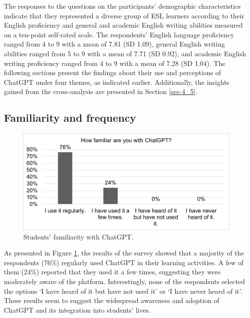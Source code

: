 \documentclass[english]{textolivre}
\begin{document}
The responses to the questions on the participants’ demographic characteristics indicate that they represented a diverse group of ESL learners according to their English proficiency and general and academic English writing abilities measured on a ten-point self-rated scale. The respondents’ English language proficiency ranged from 4 to 9 with a mean of 7.81 (SD 1.09), general English writing abilities ranged from 5 to 9 with a mean of 7.71 (SD 0.92), and academic English writing proficiency ranged from 4 to 9 with a mean of 7.28 (SD 1.04). The following sections present the findings about their use and perceptions of ChatGPT under four themes, as indicated earlier. Additionally, the insights gained from the cross-analysis are presented in Section \ref{sec-4_5}.

\subsection{Familiarity and frequency}
\begin{figure}[h!]
    \centering
    \begin{minipage}{0.80\linewidth}
    \includegraphics[width=\linewidth]{Imagens/FIGURA1.png}
    \caption{Students’ familiarity with ChatGPT.}
    \label{fig-1}
    \end{minipage}
\end{figure}

As presented in Figure \ref{fig-1}, the results of the survey showed that a majority of the respondents (76\%) regularly used ChatGPT in their learning activities. A few of them (24\%) reported that they used it a few times, suggesting they were moderately aware of the platform. Interestingly, none of the respondents selected the options ‘I have heard of it but have not used it’ or ‘I have never heard of it’. These results seem to suggest the widespread awareness and adoption of ChatGPT and its integration into students’ lives.
\end{document}
